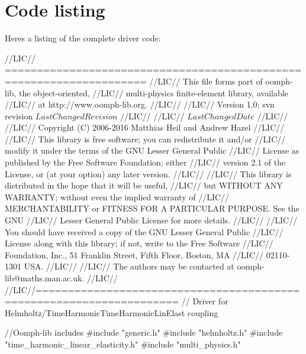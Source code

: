  

\hypertarget{index_code}{}\section{Code listing}\label{index_code}
Here\textquotesingle{}s a listing of the complete driver code\+:


\begin{DoxyCodeInclude}
\textcolor{comment}{//LIC// ====================================================================}
\textcolor{comment}{//LIC// This file forms part of oomph-lib, the object-oriented, }
\textcolor{comment}{//LIC// multi-physics finite-element library, available }
\textcolor{comment}{//LIC// at http://www.oomph-lib.org.}
\textcolor{comment}{//LIC// }
\textcolor{comment}{//LIC//    Version 1.0; svn revision $LastChangedRevision$}
\textcolor{comment}{//LIC//}
\textcolor{comment}{//LIC// $LastChangedDate$}
\textcolor{comment}{//LIC// }
\textcolor{comment}{//LIC// Copyright (C) 2006-2016 Matthias Heil and Andrew Hazel}
\textcolor{comment}{//LIC// }
\textcolor{comment}{//LIC// This library is free software; you can redistribute it and/or}
\textcolor{comment}{//LIC// modify it under the terms of the GNU Lesser General Public}
\textcolor{comment}{//LIC// License as published by the Free Software Foundation; either}
\textcolor{comment}{//LIC// version 2.1 of the License, or (at your option) any later version.}
\textcolor{comment}{//LIC// }
\textcolor{comment}{//LIC// This library is distributed in the hope that it will be useful,}
\textcolor{comment}{//LIC// but WITHOUT ANY WARRANTY; without even the implied warranty of}
\textcolor{comment}{//LIC// MERCHANTABILITY or FITNESS FOR A PARTICULAR PURPOSE.  See the GNU}
\textcolor{comment}{//LIC// Lesser General Public License for more details.}
\textcolor{comment}{//LIC// }
\textcolor{comment}{//LIC// You should have received a copy of the GNU Lesser General Public}
\textcolor{comment}{//LIC// License along with this library; if not, write to the Free Software}
\textcolor{comment}{//LIC// Foundation, Inc., 51 Franklin Street, Fifth Floor, Boston, MA}
\textcolor{comment}{//LIC// 02110-1301  USA.}
\textcolor{comment}{//LIC// }
\textcolor{comment}{//LIC// The authors may be contacted at oomph-lib@maths.man.ac.uk.}
\textcolor{comment}{//LIC// }
\textcolor{comment}{//LIC//====================================================================}
\textcolor{comment}{// Driver for Helmholtz/TimeHarmonicTimeHarmonicLinElast coupling}

\textcolor{comment}{//Oomph-lib includes}
\textcolor{preprocessor}{#include "generic.h"}
\textcolor{preprocessor}{#include "helmholtz.h"}
\textcolor{preprocessor}{#include "time\_harmonic\_linear\_elasticity.h"}
\textcolor{preprocessor}{#include "multi\_physics.h"}


\end{DoxyCodeInclude}
